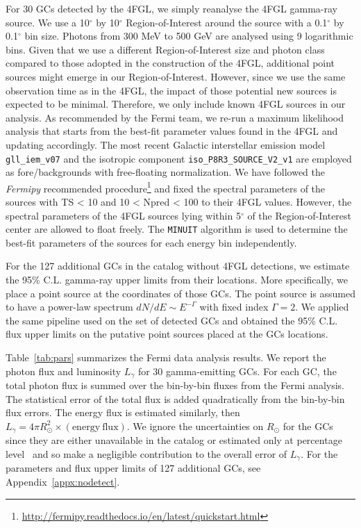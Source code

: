 \documentclass[doublespace,nopageskip]{VTthesis} %
\begin{document}
For 30 GCs detected by the 4FGL, we simply reanalyse the 4FGL gamma-ray source. We use a 10$^{\circ}$ by 10$^{\circ}$ Region-of-Interest around the source with a 0.1$^{\circ}$ by 0.1$^{\circ}$ bin size. Photons from 300 MeV to 500 GeV are analysed using 9 logarithmic bins. Given that we use a different Region-of-Interest size and photon class compared to those adopted in the construction of the 4FGL, additional point sources might emerge in our Region-of-Interest. However, since we use the same observation time as in the 4FGL, the impact of those potential new sources is expected to be minimal. Therefore, we only include known 4FGL sources in our analysis. As recommended by the Fermi team, we re-run a maximum likelihood analysis that starts from the best-fit parameter values found in the 4FGL and updating accordingly. The most recent Galactic interstellar emission model \texttt{gll\_iem\_v07} and the isotropic component \texttt{iso\_P8R3\_SOURCE\_V2\_v1} are employed as fore/backgrounds with free-floating normalization. We have followed the \textit{Fermipy} recommended procedure\footnote{\url{http://fermipy.readthedocs.io/en/latest/quickstart.html}} and fixed the spectral parameters of the sources with TS < 10 and 10 < Npred < 100 to their 4FGL values. However, the spectral parameters of the 4FGL sources lying within 5$^{\circ}$ of the Region-of-Interest center are allowed to float freely. The \texttt{MINUIT} algorithm is used to determine the best-fit parameters of the sources for each energy bin independently.

For the 127 additional GCs in the \citet{1996AJ....112.1487H} catalog without 4FGL detections, we estimate the 95\% C.L. gamma-ray upper limits from their locations. More specifically, we place a point source at the coordinates of those GCs. The point source is assumed to have a power-law spectrum $dN/dE\sim E^{-\Gamma}$ with fixed index $\Gamma = 2$. We applied the same pipeline used on the set of detected GCs and obtained the 95\% C.L. flux upper limits on the putative point sources placed at the GCs locations.

Table~\ref{tab:pars} summarizes the Fermi data analysis results. We report the photon flux and luminosity $L_\gamma$ for 30 gamma-emitting GCs. For each GC, the total photon flux is summed over the bin-by-bin fluxes from the Fermi analysis. The statistical error of the total flux is added quadratically from the bin-by-bin flux errors. The energy flux is estimated similarly, then $L_\gamma = 4\pi R_\odot^2 \times (\mathrm{energy\ flux})$. We ignore the uncertainties on $R_\odot$ for the GCs since they are either unavailable in the \citet{1996AJ....112.1487H} catalog or estimated only at percentage level~\citep{2017MNRAS.464.2174B} and so make a negligible contribution to the overall error of $L_\gamma$. For the parameters and flux upper limits of 127 additional GCs, see Appendix~\ref{appx:nodetect}.
\end{document}
